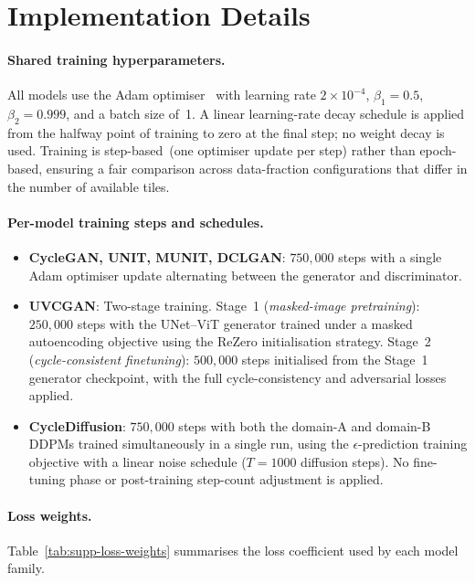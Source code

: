 
\section{Implementation Details}
\label{sec:supp-implementation}

\paragraph{Shared training hyperparameters.}
All models use the Adam optimiser~\cite{kingma2015adam} with learning rate
$2{\times}10^{-4}$, $\beta_1{=}0.5$, $\beta_2{=}0.999$, and a batch size of~1.
A linear learning-rate decay schedule is applied from the halfway point of training
to zero at the final step; no weight decay is used.
Training is step-based~(one optimiser update per step) rather than epoch-based,
ensuring a fair comparison across data-fraction configurations that differ in the
number of available tiles.

\paragraph{Per-model training steps and schedules.}
\begin{itemize}
  \item \textbf{CycleGAN, UNIT, MUNIT, DCLGAN}: $750{,}000$ steps with a single
    Adam optimiser update alternating between the generator and discriminator.
  \item \textbf{UVCGAN}: Two-stage training.
    Stage~1 (\textit{masked-image pretraining}): $250{,}000$ steps with the
    UNet--ViT generator trained under a masked autoencoding objective using the
    ReZero initialisation strategy.
    Stage~2 (\textit{cycle-consistent finetuning}): $500{,}000$ steps initialised
    from the Stage~1 generator checkpoint, with the full cycle-consistency and
    adversarial losses applied.
  \item \textbf{CycleDiffusion}: $750{,}000$ steps with both the domain-A and
    domain-B DDPMs trained simultaneously in a single run, using the
    $\epsilon$-prediction training objective with a linear noise schedule
    ($T{=}1000$ diffusion steps).
    No fine-tuning phase or post-training step-count adjustment is applied.
\end{itemize}

\paragraph{Loss weights.}
Table~\ref{tab:supp-loss-weights} summarises the loss coefficient used by each
model family.

